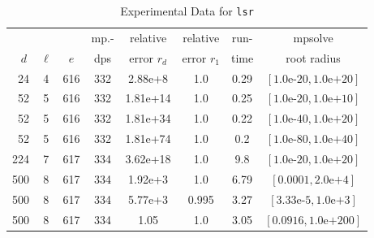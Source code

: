 \documentclass[runningheads]{llncs}
\begin{document}
\begin{table}
\caption{Experimental Data for \texttt{lsr}} %
\label{tab:lsr}
\vskip -0.15in
\begin{center}
\begin{small}
\begin{sc}
\begin{tabular}{rccccccc}
\toprule
&  &  & mp.-& relative  & relative & run- & mpsolve \\
$d~$& $\ell$& $e$ & dps&error $r_d$       & error $r_1$ &time& root radius\\
\midrule
 24 & 4 & 616 & 332 & 2.88e+8 & 1.0 & 0.29 & $[1.0\text{e-}20, 1.0\text{e+}20]$\\
 52 & 5 & 616 & 332 & 1.81e+14 & 1.0 & 0.25 & $[1.0\text{e-}20, 1.0\text{e+}10]$\\ %
 52 & 5 & 616 & 332 & 1.81e+34 & 1.0 & 0.22 & $[1.0\text{e-}40, 1.0\text{e+}20]$\\ %
 52 & 5 & 616 & 332 & 1.81e+74 & 1.0 & 0.2 & $[1.0\text{e-}80, 1.0\text{e+}40]$\\ %
 224 & 7 & 617 & 334 & 3.62e+18 & 1.0 & 9.8 & $[1.0\text{e-}20, 1.0\text{e+}20]$\\
 500 & 8 & 617 & 334 & 1.92e+3 & 1.0 & 6.79 & $[0.0001, 2.0\text{e+}4]$\\
 500 & 8 & 617 & 334 & 5.77e+3 & 0.995 & 3.27 & $[3.33\text{e-}5, 1.0\text{e+}3]$\\
 500 & 8 & 617 & 334 & 1.05 & 1.0 & 3.05 & $[0.0916, 1.0\text{e+}200]$\\
\bottomrule
\end{tabular}
\end{sc}
\end{small}
\end{center}
\vskip 0.05in
\end{table}
\end{document}
